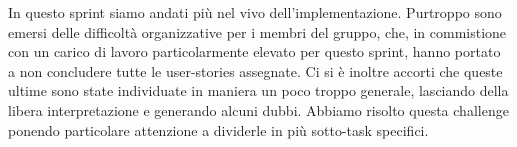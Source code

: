 In questo sprint siamo andati più nel vivo dell'implementazione. Purtroppo sono emersi delle difficoltà organizzative per i membri del gruppo, che, in commistione con un carico di lavoro particolarmente elevato per questo sprint, hanno portato a non concludere tutte le user-stories assegnate. Ci si è inoltre accorti che queste ultime sono state individuate in maniera un poco troppo generale, lasciando della libera interpretazione e generando alcuni dubbi. Abbiamo risolto questa challenge ponendo particolare attenzione a dividerle in più sotto-task specifici.  